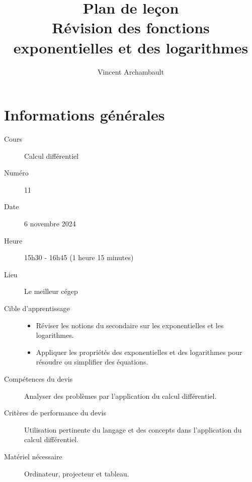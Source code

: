 \documentclass[12pt]{article}
\title{Plan de leçon\\ Révision des fonctions exponentielles et des logarithmes}
\author{Vincent Archambault}
\date{}
\begin{document}
\maketitle

\section*{Informations générales}
\begin{description}
\item[\faBook{} Cours] Calcul différentiel
\item[{\faHashtag} Numéro] 11
\item[{\faCalendar*[regular]} Date] 6 novembre 2024
\item[{\faClock[regular]} Heure] 15h30 - 16h45 (1 heure 15 minutes)
\item[\faLandmark{} Lieu] Le meilleur cégep
\item[\faBullseye{} Cible d'apprentissage]
\mbox{}\newline\leavevmode\vspace{-3ex}\begin{itemize}
    \item Réviser les notions du secondaire sur les exponentielles et les logarithmes.
    \item Appliquer les propriétés des exponentielles et des logarithmes pour résoudre ou simplifier des équations.
\end{itemize}
\item[\faToolbox{} Compétences du devis] Analyser des problèmes par l’application du calcul différentiel.
\item[\faUserCheck{} Critères de performance du devis] Utilisation pertinente du langage et des concepts dans l’application du calcul différentiel.
\item[\faTv{} Matériel nécessaire] Ordinateur, projecteur et tableau.
\end{description}

\clearpage
\end{document}
